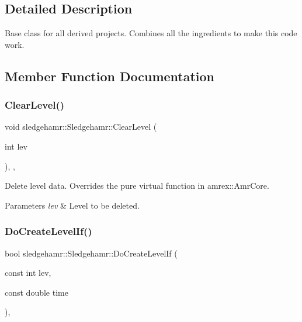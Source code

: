 \subsection{Detailed Description}
Base class for all derived projects. Combines all the ingredients to make this code work. 

\subsection{Member Function Documentation}
\mbox{\label{classsledgehamr_1_1Sledgehamr_a767607bce4ba621f509c6279faa7195f}} 
\subsubsection{\texorpdfstring{Clear\+Level()}{ClearLevel()}}
{\footnotesize\ttfamily void sledgehamr\+::\+Sledgehamr\+::\+Clear\+Level (\begin{DoxyParamCaption}\item[{int}]{lev }\end{DoxyParamCaption})\hspace{0.3cm}{\ttfamily [override]}, {\ttfamily [protected]}, {\ttfamily [virtual]}}



Delete level data. Overrides the pure virtual function in amrex\+::\+Amr\+Core. 


\begin{DoxyParams}{Parameters}
{\em lev} & Level to be deleted. \\
\hline
\end{DoxyParams}
\mbox{\label{classsledgehamr_1_1Sledgehamr_a55951d4d585f60943a265c02666a38c0}} 
\subsubsection{\texorpdfstring{Do\+Create\+Level\+If()}{DoCreateLevelIf()}}
{\footnotesize\ttfamily bool sledgehamr\+::\+Sledgehamr\+::\+Do\+Create\+Level\+If (\begin{DoxyParamCaption}\item[{const int}]{lev,  }\item[{const double}]{time }\end{DoxyParamCaption})\hspace{0.3cm}{\ttfamily [inline]}, {\ttfamily [protected]}}



